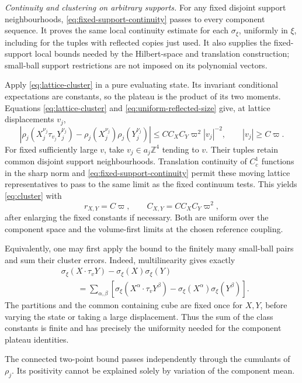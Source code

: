 \documentclass[11pt,letterpaper,reqno]{amsart}
\theoremstyle{definition}
\theoremstyle{remark}
\begin{document}
\emph{Continuity and clustering on arbitrary supports.}
For any fixed disjoint support neighbourhoods,
\eqref{eq:fixed-support-continuity} passes to
every component sequence. It proves the same
local continuity estimate for each \(\sigma_\xi\),
uniformly in \(\xi\), including for the tuples
with reflected copies just used.
It also supplies the fixed-support local bounds
needed by the Hilbert-space and translation
construction; small-ball support restrictions
are not imposed on its polynomial vectors.

Apply \eqref{eq:lattice-cluster} in a pure
evaluating state. Its invariant conditional
expectations are constants, so the plateau
is the product of its two moments.
Equations \eqref{eq:lattice-cluster} and
\eqref{eq:uniform-reflected-size} give, at
lattice displacements \(v_j\),
\[
 \left|\rho_j(X_j^{\nu_j}\tau_{v_j}Y_j^{\nu_j})
       -\rho_j(X_j^{\nu_j})\rho_j(Y_j^{\nu_j})\right|
       \le C C_XC_Y\varpi^2|v_j|^{-2},
 \qquad |v_j|\ge C\varpi .
\]
For fixed sufficiently large \(v\), take
\(v_j\in a_j\mathbb Z^4\) tending to \(v\).
Their tuples retain common disjoint support
neighbourhoods. Translation continuity of
\(C_c^1\) functions in the sharp norm and
\eqref{eq:fixed-support-continuity} permit
these moving lattice representatives to pass
to the same limit as the fixed continuum tests.
This yields \eqref{eq:cluster} with
\[
 r_{X,Y}=C\varpi,\qquad
 C_{X,Y}=C C_XC_Y\varpi^2,
\]
after enlarging the fixed constants if necessary.
Both are uniform over the component space
and the volume-first limits at the chosen
reference coupling.

Equivalently, one may first apply the bound
to the finitely many small-ball pairs and
sum their cluster errors. Indeed, multilinearity
gives exactly
\[
 \begin{split}
 &\sigma_\xi(X\cdot\tau_vY)
                         -\sigma_\xi(X)\sigma_\xi(Y)\\
 &\qquad=\sum_{\alpha,\beta}
 \left[\sigma_\xi(X^\alpha\cdot\tau_vY^\beta)
             -\sigma_\xi(X^\alpha)\sigma_\xi(Y^\beta)\right].
 \end{split}
\]
The partitions and the common containing
cube are fixed once for \(X,Y\), before
varying the state or taking a large displacement.
Thus the sum of the class constants is finite
and has precisely the uniformity needed for
the component plateau identities.

The connected two-point bound passes
independently through the cumulants of
\(\rho_j\). Its positivity cannot be
explained solely by variation of the
component mean.
\end{document}
